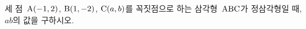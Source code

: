 세 점~$\mathrm{A}(-1{,}\mkern3mu\mathopen{}2)$, $\mathrm{B}(1{,}\mkern3mu\mathopen{}-2)$, $\mathrm{C}(a{,}\mkern3mu\mathopen{}b)$를 꼭짓점으로 하는 삼각형~$\mathrm{ABC}$가 정삼각형일 때, $ab$의 값을 구하시오.
